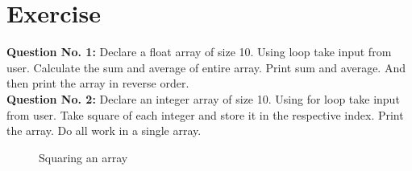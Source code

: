 \documentclass{article}
\begin{document}
\section{Exercise}
\textbf{Question No. 1:} Declare a float array of size 10. Using loop take input from user. Calculate the sum and average of entire array. Print sum and average. And then print the array in reverse order.\\
\textbf{Question No. 2:} Declare an integer array of size 10. Using for loop take input from user. Take square of each integer and store it in the respective index. Print the array. Do all work in a single array.
\begin{figure}[H]
\centering
\caption{Squaring an array}
\label{Array-Squaring}

\end{figure}
\end{document}
